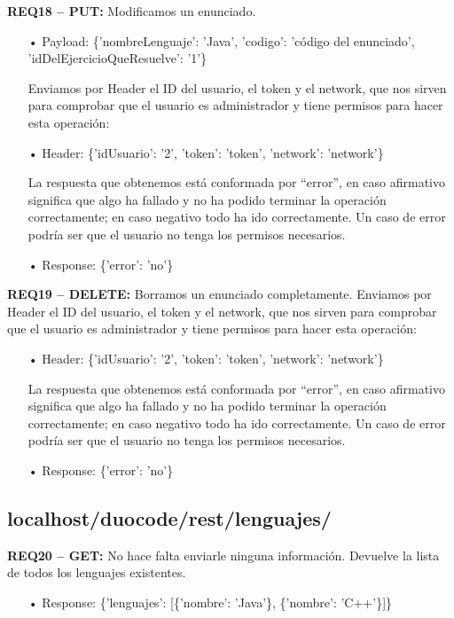 \textbf{REQ18 – PUT:} Modificamos un enunciado.

\begin{itemize}
\item[•]
Payload: \{'nombreLenguaje': 'Java', 'codigo': 'código del enunciado', 'idDelEjercicioQueResuelve': '1'\}
\vspace{1em}

Enviamos por Header el ID del usuario, el token y el network, que nos sirven para comprobar que el usuario es administrador y tiene permisos para hacer esta operación:
\item[•]
Header: 
\{'idUsuario': '2', 'token': 'token', 'network': 'network'\}
\vspace{1em}

La respuesta que obtenemos está conformada por “error”, en caso afirmativo significa que algo ha fallado y no ha podido terminar la operación correctamente; en caso negativo todo ha ido correctamente. Un caso de error podría ser que el usuario no tenga los permisos necesarios.
\item[•]
Response: 
\{'error': 'no'\}
\end{itemize}

\textbf{REQ19 – DELETE:} Borramos un enunciado completamente. Enviamos por Header el ID del usuario, el token y el network, que nos sirven para comprobar que el usuario es administrador y tiene permisos para hacer esta operación:
\begin{itemize}
\item[•]
Header: 
\{'idUsuario': '2', 'token': 'token', 'network': 'network'\}
\vspace{1em}

La respuesta que obtenemos está conformada por “error”, en caso afirmativo significa que algo ha fallado y no ha podido terminar la operación correctamente; en caso negativo todo ha ido correctamente. Un caso de error podría ser que el usuario no tenga los permisos necesarios.
\item[•]
Response: 
\{'error': 'no'\}
\end{itemize}

\subsection{localhost/duocode/rest/lenguajes/}
\textbf{REQ20 – GET:} No hace falta enviarle ninguna información. Devuelve la lista de todos los lenguajes existentes. 
\begin{itemize}
\item[•]
Response: 
\{'lenguajes': [\{'nombre': 'Java'\}, \{'nombre': 'C++'\}]\}
\end{itemize}

